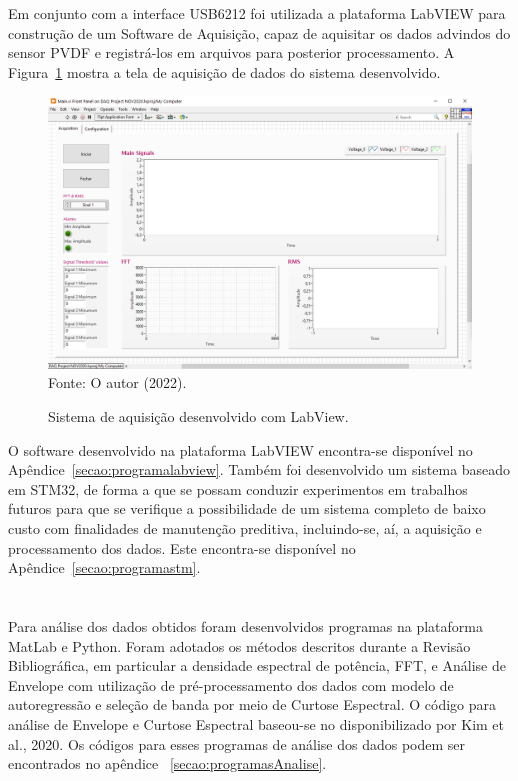 \documentclass[
	12pt,				
	oneside,			
	a4paper,			
	english,			
	brazil,			
	]{abntex2ppgsi}
\begin{document}
Em conjunto com a interface USB6212 foi utilizada a plataforma LabVIEW para construção de um Software de Aquisição, capaz de aquisitar os dados advindos do sensor PVDF e registrá-los em arquivos para posterior processamento. A Figura~\ref{sistema_labview} mostra a tela de aquisição de dados do sistema desenvolvido. 

\begin{figure}[H]
\centering
\caption {Sistema de aquisição desenvolvido com LabView.}
\includegraphics[width=\textwidth,height=\textheight,keepaspectratio]{sistema_labview} \\
Fonte: O autor (2022).
\label{sistema_labview}
\end{figure} 

O software desenvolvido na plataforma LabVIEW encontra-se disponível no Apêndice~\ref{secao:programalabview}. Também foi desenvolvido um sistema baseado em STM32, de forma a que se possam conduzir experimentos em trabalhos futuros para que se verifique a possibilidade de um sistema completo de baixo custo com finalidades de manutenção preditiva, incluindo-se, aí, a aquisição e processamento dos dados. Este encontra-se disponível no Apêndice~\ref{secao:programastm}.


\section{}

Para análise dos dados obtidos foram desenvolvidos programas na plataforma MatLab e Python. Foram adotados os métodos descritos durante a Revisão Bibliográfica, em particular a densidade espectral de potência, FFT, e Análise de Envelope com utilização de pré-processamento dos dados com modelo de autoregressão e seleção de banda por meio de Curtose Espectral. O código para análise de Envelope e Curtose Espectral baseou-se no disponibilizado por Kim et al., 2020. Os códigos para esses programas de análise dos dados podem ser encontrados no apêndice ~\ref{secao:programasAnalise}.
\end{document}
